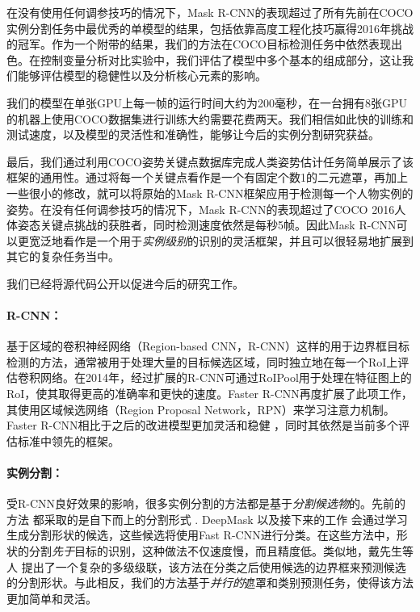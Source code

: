 在没有使用任何调参技巧的情况下，Mask R-CNN的表现超过了所有先前在COCO实例分割任务中最优秀的单模型的结果，包括依靠高度工程化技巧赢得2016年挑战的冠军。作为一个附带的结果，我们的方法在COCO目标检测任务中依然表现出色。在控制变量分析对比实验中，我们评估了模型中多个基本的组成部分，这让我们能够评估模型的稳健性以及分析核心元素的影响。

我们的模型在单张GPU上每一帧的运行时间大约为200毫秒，在一台拥有8张GPU的机器上使用COCO数据集进行训练大约需要花费两天。我们相信如此快的训练和测试速度，以及模型的灵活性和准确性，能够让今后的实例分割研究获益。

最后，我们通过利用COCO姿势关键点数据库完成人类姿势估计任务简单展示了该框架的通用性。通过将每一个关键点看作是一个有固定个数1的二元遮罩，再加上一些很小的修改，就可以将原始的Mask R-CNN框架应用于检测每一个人物实例的姿势。在没有任何调参技巧的情况下，Mask R-CNN的表现超过了COCO 2016人体姿态关键点挑战的获胜者，同时检测速度依然是每秒5帧。因此Mask R-CNN可以更宽泛地看作是一个用于\emph{实例级别}的识别的灵活框架，并且可以很轻易地扩展到其它的复杂任务当中。

我们已经将源代码公开以促进今后的研究工作。


\paragraph{R-CNN：} 基于区域的卷积神经网络（Region-based CNN，R-CNN）这样的用于边界框目标检测的方法，通常被用于处理大量的目标候选区域，同时独立地在每一个RoI上评估卷积网络。在2014年，经过扩展的R-CNN可通过RoIPool用于处理在特征图上的RoI，使其取得更高的准确率和更快的速度。Faster R-CNN再度扩展了此项工作，其使用区域候选网络（Region Proposal Network，RPN）来学习注意力机制。Faster R-CNN相比于之后的改进模型更加灵活和稳健 ，同时其依然是当前多个评估标准中领先的框架。

\paragraph{实例分割：} 受R-CNN良好效果的影响，很多实例分割的方法都是基于\emph{分割候选物}的。先前的方法  都采取的是自下而上的分割形式 . DeepMask  以及接下来的工作  会通过学习生成分割形状的候选，这些候选将使用Fast R-CNN进行分类。在这些方法中，形状的分割\emph{先于}目标的识别，这种做法不仅速度慢，而且精度低。类似地，戴先生等人  提出了一个复杂的多级级联，该方法在分类之后使用候选的边界框来预测候选的分割形状。与此相反，我们的方法基于\emph{并行的}遮罩和类别预测任务，使得该方法更加简单和灵活。

